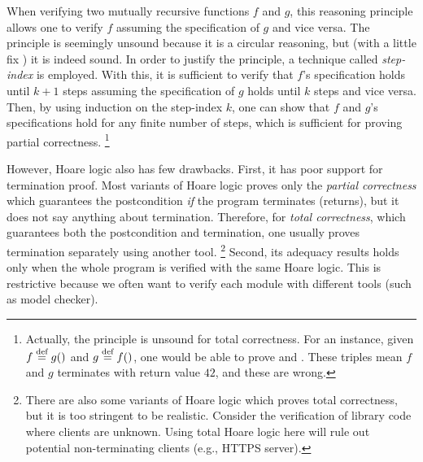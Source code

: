 \noindent When verifying two mutually recursive functions $f$ and $g$, this reasoning principle allows one to verify $f$ assuming the specification of $g$ and vice versa.
The principle is seemingly unsound because it is a circular reasoning, but (with a little fix ) it is indeed sound. %
In order to justify the principle, a technique called {\it step-index} is employed.
With this, it is sufficient to verify that $f$'s specification holds until $k+1$ steps assuming the specification of $g$ holds until $k$ steps and vice versa.
Then, by using induction on the step-index $k$, one can show that $f$ and $g$'s specifications hold for any finite number of steps, which is sufficient for proving partial correctness.
\footnote{Actually, the principle is unsound for total correctness. For an instance, given $f \stackrel{\text{def}}{=} g()$ and $g \stackrel{\text{def}}{=} f()$, one would be able to prove  and .
  These triples mean $f$ and $g$ terminates with return value $42$, and these are wrong. }




However, Hoare logic also has few drawbacks.
First, it has poor support for termination proof.
Most variants of Hoare logic proves only the {\it partial correctness} which guarantees the postcondition {\it if} the program terminates (returns), but it does not say anything about termination.
Therefore, for {\it total correctness}, which guarantees both the postcondition and termination, one usually proves termination separately using another tool.
\footnote{There are also some variants of Hoare logic which proves total correctness, but it is too stringent to be realistic. Consider the verification of library code where clients are unknown.
Using total Hoare logic here will rule out potential non-terminating clients (e.g., HTTPS server).}
Second, its adequacy results holds only when the whole program is verified with the same Hoare logic. This is restrictive because we often want to verify each module with different tools (such as model checker).





